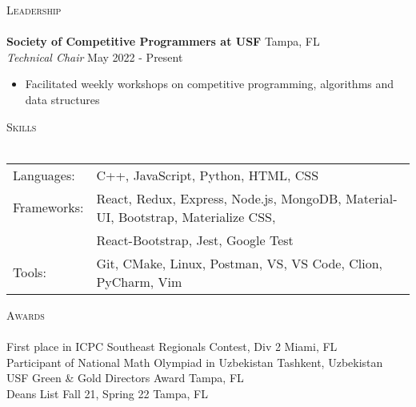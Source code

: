 \documentclass[a4paper]{article}
\newcommand{\lineunder} {
    \vspace*{-8pt} \\
    \hspace*{-18pt} \hrulefill \\
}
\newcommand{\header} [1] {
    {\hspace*{-18pt}\vspace*{6pt} \textsc{#1}}
    \vspace*{-6pt} \lineunder
}
\begin{document}
{\Large \header{Leadership}}
\vspace{1mm}
\textbf{Society of Competitive Programmers at USF} \hfill Tampa, FL\\
\textit{Technical Chair} \hfill May 2022 - Present\\
\vspace{-1mm}
\begin{itemize} \itemsep 1pt
    \item Facilitated weekly workshops on competitive programming, algorithms and data structures
\end{itemize}
{\Large \header{Skills}}
\vspace{1mm}
\begin{tabular}{ l l }
	Languages:  & C++, JavaScript, Python, HTML, CSS                                                 \\
	Frameworks: & React, Redux, Express, Node.js, MongoDB, Material-UI, Bootstrap, Materialize CSS,  \\
	            & React-Bootstrap, Jest, Google Test \\
	Tools:      & Git, CMake, Linux, Postman, VS, VS Code, Clion, PyCharm, Vim                                                 \\
\end{tabular}
\vspace{2mm}

{\Large \header{Awards}}
First place in ICPC Southeast Regionals Contest, Div 2 \hfill Miami, FL\\
Participant of National Math Olympiad in Uzbekistan \hfill Tashkent, Uzbekistan\\
USF Green \& Gold Directors Award \hfill Tampa, FL\\
Dean\textquotesingle{}s List Fall 21, Spring 22 \hfill Tampa, FL\\
\ 
\end{document}

